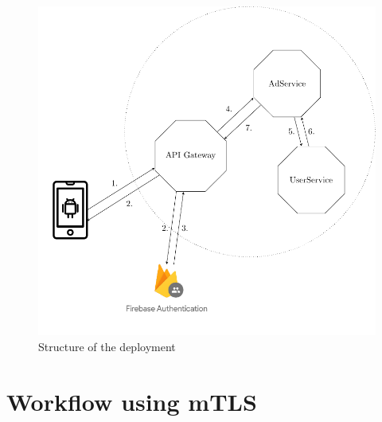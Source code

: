 \begin{figure}
	\centering
	\includegraphics{images/project-structure/TikZ_structure.pdf}
	\caption{Structure of the deployment}
	\label{fig:deployment_structure}
\end{figure}

\section{Workflow using mTLS}

